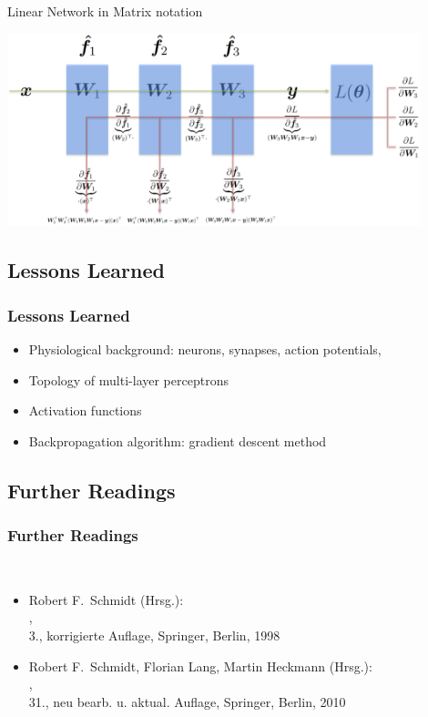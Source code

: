 \begin{frame}{Linear Network in Matrix notation}
	\begin{center}
		\includegraphics[width=0.9\textwidth]{png/gradient_derviation3.png}
	\end{center}
\end{frame}

\subsection{Lessons Learned}

\begin{frame}
  \frametitle{Lessons Learned}
  
  \begin{itemize}  
    \item Physiological background: neurons, synapses, action potentials, \\[.25cm]
    \item Topology of multi-layer perceptrons \\[.25cm]
    \item Activation functions \\[.25cm]
    \item Backpropagation algorithm: gradient descent method
  \end{itemize}
\end{frame}



\subsection{Further Readings}

\begin{frame}
  \frametitle{Further Readings}
  
  \\[.25cm]
  
  \begin{itemize}
    \item Robert F.\ Schmidt (Hrsg.): \\
      , \\
      3., korrigierte Auflage, Springer, Berlin, 1998 \\[.25cm]
    \item Robert F.\ Schmidt, Florian Lang, Martin Heckmann (Hrsg.): \\
      , \\
      31., neu bearb. u. aktual. Auflage, Springer, Berlin, 2010
  \end{itemize}
\end{frame}
